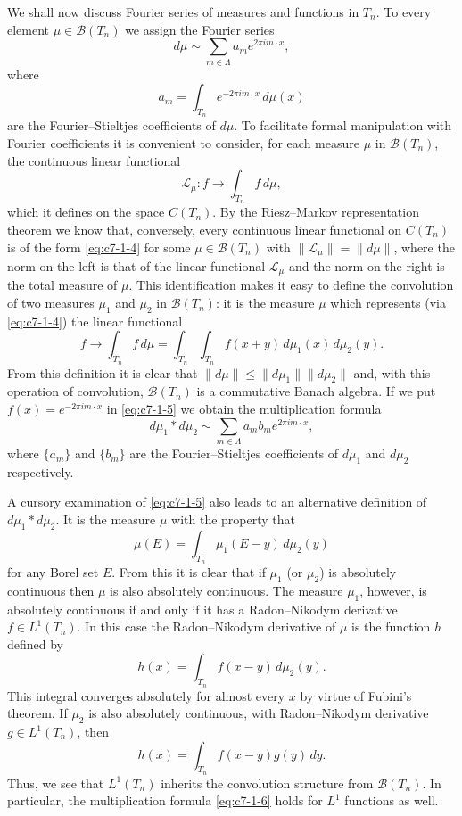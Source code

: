We shall now discuss Fourier series of measures and functions in $T_n$. To every element $\mu \in \mathcal{B}(T_n)$ we assign the Fourier series
\begin{equation}\label{eq:c7-1-2}
d\mu \sim \sum_{m \in \Lambda} a_m e^{2\pi i m \cdot x},
\end{equation}
where
\begin{equation}\label{eq:c7-1-3}
a_m = \int_{T_n} e^{-2\pi i m \cdot x}\,d\mu(x)
\end{equation}
are the Fourier--Stieltjes coefficients of $d\mu$. To facilitate formal manipulation with Fourier coefficients it is convenient to consider, for each measure $\mu$ in $\mathcal{B}(T_n)$, the continuous linear functional
\begin{equation}\label{eq:c7-1-4}
\mathcal{L}_\mu : f \to \int_{T_n} f\,d\mu,
\end{equation}
which it defines on the space $C(T_n)$. By the Riesz--Markov representation theorem we know that, conversely, every continuous linear functional on $C(T_n)$ is of the form \eqref{eq:c7-1-4} for some $\mu \in \mathcal{B}(T_n)$ with $\|\mathcal{L}_\mu\| = \|d\mu\|$, where the norm on the left is that of the linear functional $\mathcal{L}_\mu$ and the norm on the right is the total measure of $\mu$. This identification makes it easy to define the convolution of two measures $\mu_1$ and $\mu_2$ in $\mathcal{B}(T_n)$: it is the measure $\mu$ which represents (via \eqref{eq:c7-1-4}) the linear functional
\begin{equation}\label{eq:c7-1-5}
f \to \int_{T_n} f\,d\mu = \int_{T_n} \int_{T_n} f(x + y)\,d\mu_1(x)\,d\mu_2(y).
\end{equation}
From this definition it is clear that $\|d\mu\| \leq \|d\mu_1\| \|d\mu_2\|$ and, with this operation of convolution, $\mathcal{B}(T_n)$ is a commutative Banach algebra. If we put $f(x) = e^{-2\pi i m \cdot x}$ in \eqref{eq:c7-1-5} we obtain the multiplication formula
\begin{equation}\label{eq:c7-1-6}
d\mu_1 * d\mu_2 \sim \sum_{m \in \Lambda} a_m b_m e^{2\pi i m \cdot x},
\end{equation}
where $\{a_m\}$ and $\{b_m\}$ are the Fourier--Stieltjes coefficients of $d\mu_1$ and $d\mu_2$ respectively.

A cursory examination of \eqref{eq:c7-1-5} also leads to an alternative definition of $d\mu_1 * d\mu_2$. It is the measure $\mu$ with the property that
\[
\mu(E) = \int_{T_n} \mu_1(E - y)\,d\mu_2(y)
\]
for any Borel set $E$. From this it is clear that if $\mu_1$ (or $\mu_2$) is absolutely continuous then $\mu$ is also absolutely continuous. The measure $\mu_1$, however, is absolutely continuous if and only if it has a Radon--Nikodym derivative $f \in L^1(T_n)$. In this case the Radon--Nikodym derivative of $\mu$ is the function $h$ defined by
\[
h(x) = \int_{T_n} f(x - y)\,d\mu_2(y).
\]
This integral converges absolutely for almost every $x$ by virtue of Fubini's theorem. If $\mu_2$ is also absolutely continuous, with Radon--Nikodym derivative $g \in L^1(T_n)$, then
\[
h(x) = \int_{T_n} f(x - y) g(y)\,dy.
\]
Thus, we see that $L^1(T_n)$ inherits the convolution structure from $\mathcal{B}(T_n)$. In particular, the multiplication formula \eqref{eq:c7-1-6} holds for $L^1$ functions as well.

